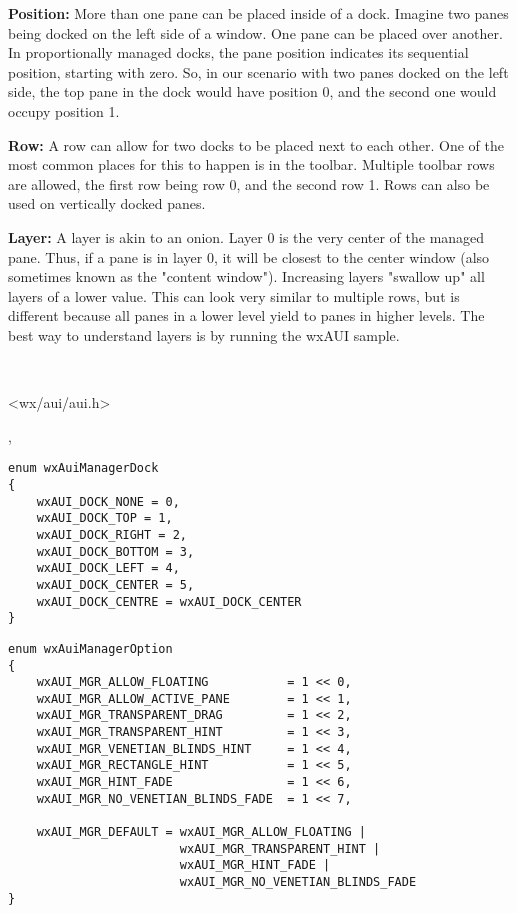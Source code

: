 {\bf Position:}
More than one pane can be placed inside of a dock. Imagine two panes
being docked on the left side of a window. One pane can be placed over
another. In proportionally managed docks, the pane position indicates
its sequential position, starting with zero. So, in our scenario with
two panes docked on the left side, the top pane in the dock would have
position 0, and the second one would occupy position 1.

{\bf Row:}
A row can allow for two docks to be placed next to each other. One of
the most common places for this to happen is in the toolbar. Multiple
toolbar rows are allowed, the first row being row 0, and the second
row 1. Rows can also be used on vertically docked panes.

{\bf Layer:}
A layer is akin to an onion. Layer 0 is the very center of the
managed pane. Thus, if a pane is in layer 0, it will be closest to the
center window (also sometimes known as the "content window").
Increasing layers "swallow up" all layers of a lower value. This can
look very similar to multiple rows, but is different because all panes
in a lower level yield to panes in higher levels. The best way to
understand layers is by running the wxAUI sample.


\\


<wx/aui/aui.h>


,


\begin{verbatim}
enum wxAuiManagerDock
{
    wxAUI_DOCK_NONE = 0,
    wxAUI_DOCK_TOP = 1,
    wxAUI_DOCK_RIGHT = 2,
    wxAUI_DOCK_BOTTOM = 3,
    wxAUI_DOCK_LEFT = 4,
    wxAUI_DOCK_CENTER = 5,
    wxAUI_DOCK_CENTRE = wxAUI_DOCK_CENTER
}
\end{verbatim}

\begin{verbatim}
enum wxAuiManagerOption
{
    wxAUI_MGR_ALLOW_FLOATING           = 1 << 0,
    wxAUI_MGR_ALLOW_ACTIVE_PANE        = 1 << 1,
    wxAUI_MGR_TRANSPARENT_DRAG         = 1 << 2,
    wxAUI_MGR_TRANSPARENT_HINT         = 1 << 3,
    wxAUI_MGR_VENETIAN_BLINDS_HINT     = 1 << 4,
    wxAUI_MGR_RECTANGLE_HINT           = 1 << 5,
    wxAUI_MGR_HINT_FADE                = 1 << 6,
    wxAUI_MGR_NO_VENETIAN_BLINDS_FADE  = 1 << 7,

    wxAUI_MGR_DEFAULT = wxAUI_MGR_ALLOW_FLOATING |
                        wxAUI_MGR_TRANSPARENT_HINT |
                        wxAUI_MGR_HINT_FADE |
                        wxAUI_MGR_NO_VENETIAN_BLINDS_FADE
}
\end{verbatim}


